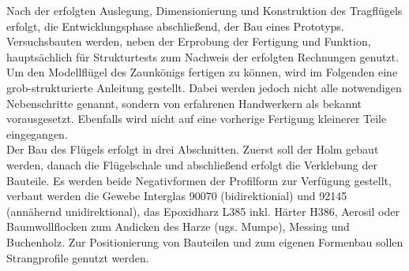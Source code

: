 Nach der erfolgten Auslegung, Dimensionierung und Konstruktion des Tragflügels erfolgt, die Entwicklungsphase abschließend, der Bau eines Prototyps. Versuchsbauten werden, neben der Erprobung der Fertigung und Funktion, hauptsächlich für Strukturtests zum Nachweis der erfolgten Rechnungen genutzt. Um den Modellflügel des Zaunkönigs fertigen zu können, wird im Folgenden eine grob-strukturierte Anleitung gestellt. Dabei werden jedoch nicht alle notwendigen Nebenschritte genannt, sondern von erfahrenen Handwerkern als bekannt vorausgesetzt. Ebenfalls wird nicht auf eine vorherige Fertigung kleinerer Teile eingegangen.\\

\noindent Der Bau des Flügels erfolgt in drei Abschnitten. Zuerst soll der Holm gebaut werden, danach die Flügelschale und abschließend erfolgt die Verklebung der Bauteile.
Es werden beide Negativformen der Profilform zur Verfügung gestellt, verbaut werden die Gewebe Interglas 90070 (bidirektionial) und 92145 (annähernd unidirektional), das Epoxidharz L385 inkl. Härter H386, Aerosil oder Baumwollflocken zum Andicken des Harze (ugs. Mumpe), Messing und Buchenholz. Zur Positionierung von Bauteilen und zum eigenen Formenbau sollen Strangprofile genutzt werden. 

